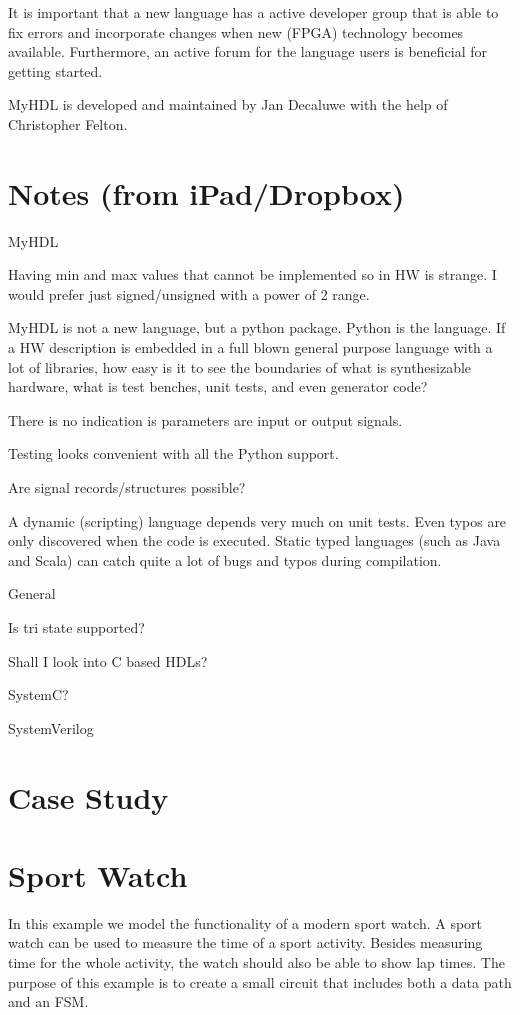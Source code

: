 \documentclass[10pt, technote, draftcls, onecolumn]{IEEEtran}
\begin{document}
It is important that a new language has a active developer group that is
able to fix errors and incorporate changes when new (FPGA) technology
becomes available. Furthermore, an active forum for the language users
is beneficial for getting started.

MyHDL is developed and maintained by Jan Decaluwe with the help of
Christopher Felton.  

\section{Notes (from iPad/Dropbox)}

MyHDL

Having min and max values that cannot be implemented so in HW is strange. I would prefer just signed/unsigned with a power of 2 range.

MyHDL is not a new language, but a python package. Python is the language. If a HW description is embedded in a full blown general purpose language with a lot of libraries, how easy is it to see the boundaries of what is synthesizable hardware, what is test benches, unit tests, and even generator code?

There is no indication is parameters are input or output signals.

Testing looks convenient with all the Python support.

Are signal records/structures possible?

A dynamic (scripting) language depends very much on unit tests. Even typos are only
discovered when the code is executed. Static typed languages (such as Java
and Scala) can catch quite a lot of bugs and typos during compilation.

General

Is tri state supported?

Shall I look into C based HDLs?

SystemC?

SystemVerilog

\section{Case Study}

\section{Sport Watch}
In this example we model the functionality of a modern sport
watch. A sport watch can be used to 
measure the time of a sport activity. Besides measuring time for the
whole activity, the watch should also be able to show lap times. The
purpose of this example is to create a small circuit that includes both
a data path and an FSM.
\end{document}
